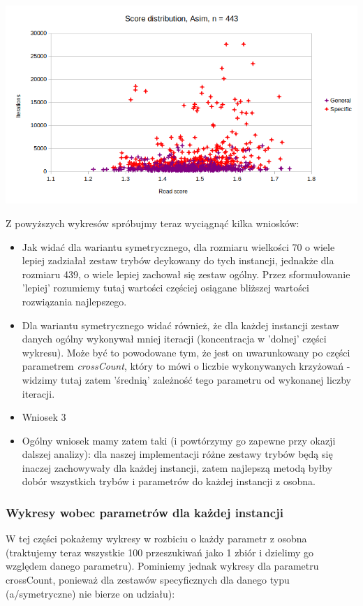 \documentclass{article}
\begin{document}
\includegraphics[scale=0.36]{parDistAsim443}

Z powyższych wykresów spróbujmy teraz wyciągnąć kilka wniosków:
\begin{itemize}
	\item Jak widać dla wariantu symetrycznego, dla rozmiaru wielkości 70 o wiele lepiej zadziałał zestaw trybów deykowany do tych instancji, jednakże dla rozmiaru 439, o wiele lepiej zachował się zestaw ogólny. Przez sformułowanie 'lepiej' rozumiemy tutaj wartości częściej osiągane bliższej wartości rozwiązania najlepszego.
	\item Dla wariantu symetrycznego widać również, że dla każdej instancji zestaw danych ogólny wykonywał mniej iteracji (koncentracja w 'dolnej' części wykresu). Może być to powodowane tym, że jest on uwarunkowany po części parametrem \textit{crossCount}, który to mówi o liczbie wykonywanych krzyżowań - widzimy tutaj zatem 'średnią' zależność tego parametru od wykonanej liczby iteracji.
	\item Wniosek 3
	\item Ogólny wniosek mamy zatem taki (i powtórzymy go zapewne przy okazji dalszej analizy): dla naszej implementacji różne zestawy trybów będą się inaczej zachowywały dla każdej instancji, zatem najlepszą metodą byłby dobór wszystkich trybów i parametrów do każdej instancji z osobna.
\end{itemize}

\subsubsection{Wykresy wobec parametrów dla każdej instancji}
W tej części pokażemy wykresy w rozbiciu o każdy parametr z osobna (traktujemy teraz wszystkie 100 przeszukiwań jako 1 zbiór i dzielimy go względem danego parametru). Pominiemy jednak wykresy dla parametru crossCount, ponieważ dla zestawów specyficznych dla danego typu (a/symetryczne) nie bierze on udziału):
\end{document}
